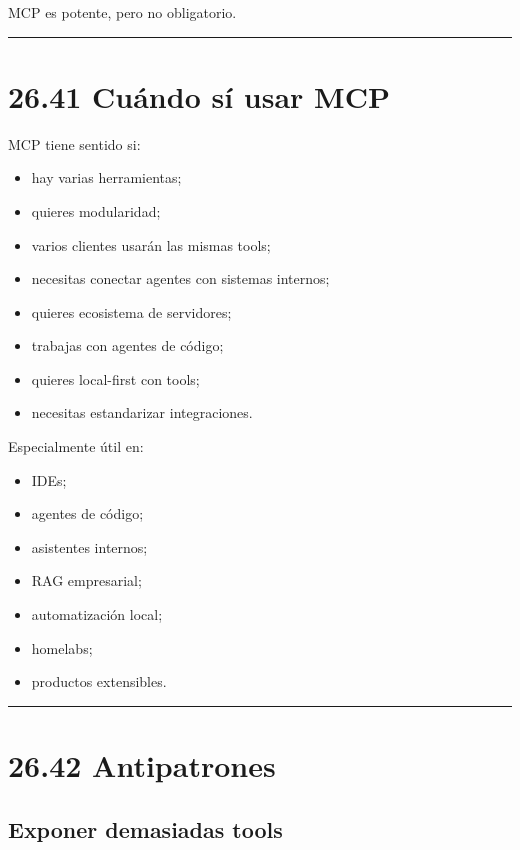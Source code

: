 MCP es potente, pero no obligatorio.

\begin{center}\rule{0.5\linewidth}{0.5pt}\end{center}

\section{26.41 Cuándo sí usar MCP}\label{cuuxe1ndo-suxed-usar-mcp}

MCP tiene sentido si:

\begin{itemize}
\tightlist
\item
  hay varias herramientas;
\item
  quieres modularidad;
\item
  varios clientes usarán las mismas tools;
\item
  necesitas conectar agentes con sistemas internos;
\item
  quieres ecosistema de servidores;
\item
  trabajas con agentes de código;
\item
  quieres local-first con tools;
\item
  necesitas estandarizar integraciones.
\end{itemize}

Especialmente útil en:

\begin{itemize}
\tightlist
\item
  IDEs;
\item
  agentes de código;
\item
  asistentes internos;
\item
  RAG empresarial;
\item
  automatización local;
\item
  homelabs;
\item
  productos extensibles.
\end{itemize}

\begin{center}\rule{0.5\linewidth}{0.5pt}\end{center}

\section{26.42 Antipatrones}\label{antipatrones-15}

\subsection{Exponer demasiadas tools}\label{exponer-demasiadas-tools}

